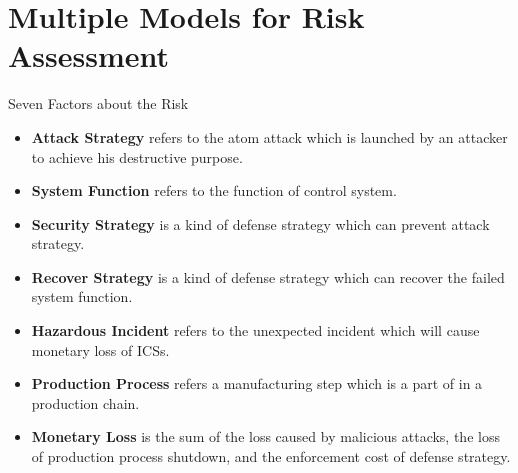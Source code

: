 \documentclass[10pt]{beamer}
\begin{document}
\section{Multiple Models for Risk Assessment}
\begin{frame}{Seven Factors about the Risk}
\vspace{10pt}\hspace{-30pt}
\begin{minipage}{1.12\textwidth}
    \begin{itemize}[<+->]
      \item \textbf{Attack Strategy} refers to the atom attack which is launched by an attacker to achieve his destructive purpose.
      \item \textbf{System Function} refers to the function of control system.
      \item \textbf{Security Strategy} is a kind of defense strategy which can prevent attack strategy.
      \item \textbf{Recover Strategy} is a kind of defense strategy which can recover the failed system function.
      \item \textbf{Hazardous Incident} refers to the unexpected incident which will cause monetary loss of ICSs.
      \item \textbf{Production Process} refers a manufacturing step which is a part of in a production chain.
      \item \textbf{Monetary Loss} is the sum of the loss caused by malicious attacks, the loss of production process shutdown, and the enforcement cost of defense strategy.
    \end{itemize}
\end{minipage}
\end{frame}
\end{document}
